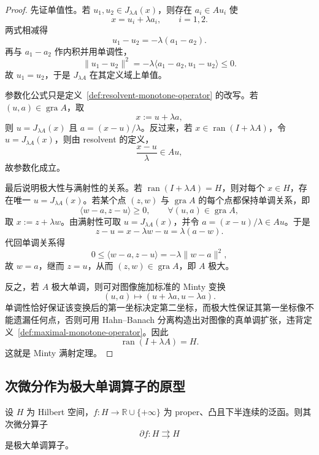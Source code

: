 \begin{proof}
先证单值性。若 $u_1,u_2\in J_{\lambda A}(x)$，则存在 $a_i\in A u_i$ 使
\[
x=u_i+\lambda a_i,\qquad i=1,2.
\]
两式相减得
\[
u_1-u_2=-\lambda(a_1-a_2).
\]
再与 $a_1-a_2$ 作内积并用单调性，
\[
\|u_1-u_2\|^2
=
-\lambda\langle a_1-a_2,u_1-u_2\rangle
\le 0.
\]
故 $u_1=u_2$，于是 $J_{\lambda A}$ 在其定义域上单值。

参数化公式只是定义~\ref{def:resolvent-monotone-operator} 的改写。若 $(u,a)\in \operatorname{gra} A$，取
\[
x:=u+\lambda a,
\]
则 $u=J_{\lambda A}(x)$ 且 $a=(x-u)/\lambda$。反过来，若 $x\in \operatorname{ran}(I+\lambda A)$，令 $u=J_{\lambda A}(x)$，则由 resolvent 的定义，
\[
\frac{x-u}{\lambda}\in A u,
\]
故参数化成立。

最后说明极大性与满射性的关系。若 $\operatorname{ran}(I+\lambda A)=H$，则对每个 $x\in H$，存在唯一 $u=J_{\lambda A}(x)$。若某个点 $(z,w)$ 与 $\operatorname{gra} A$ 的每个点都保持单调关系，即
\[
\langle w-a,z-u\rangle\ge 0,\qquad \forall (u,a)\in \operatorname{gra} A,
\]
取 $x:=z+\lambda w$。由满射性可取 $u=J_{\lambda A}(x)$，并令 $a=(x-u)/\lambda\in A u$。于是
\[
z-u=x-\lambda w-u=\lambda(a-w).
\]
代回单调关系得
\[
0\le \langle w-a,z-u\rangle
=
-\lambda\|w-a\|^2,
\]
故 $w=a$，继而 $z=u$，从而 $(z,w)\in \operatorname{gra} A$，即 $A$ 极大。

反之，若 $A$ 极大单调，则可对图像施加标准的 Minty 变换
\[
(u,a)\mapsto (u+\lambda a,u-\lambda a).
\]
单调性恰好保证该变换后的第一坐标决定第二坐标，而极大性保证其第一坐标像不能遗漏任何点，否则可用 Hahn--Banach 分离构造出对图像的真单调扩张，违背定义~\ref{def:maximal-monotone-operator}。因此
\[
\operatorname{ran}(I+\lambda A)=H.
\]
这就是 Minty 满射定理。
\end{proof}

\subsection{次微分作为极大单调算子的原型}

\begin{theorem}[次微分的极大单调性]\label{thm:subdifferential-maximal-monotone}
设 $H$ 为 Hilbert 空间，$f\colon H\to \mathbb R\cup\{+\infty\}$ 为 proper、凸且下半连续的泛函。则其次微分算子
\[
\partial f\colon H\rightrightarrows H
\]
是极大单调算子。
\end{theorem}

